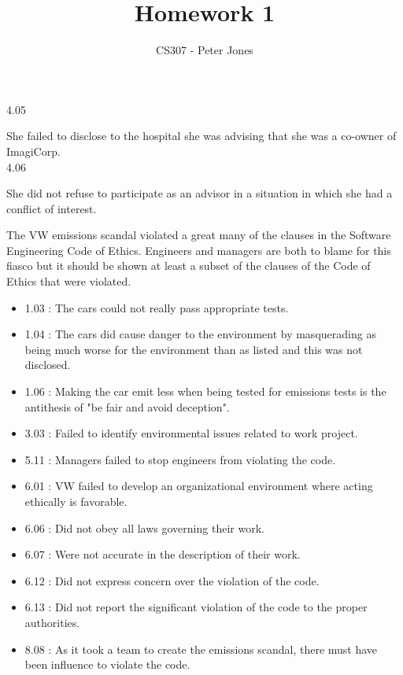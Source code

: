 \documentclass[12pt]{article}
\newenvironment{problem}[2][Problem]{\begin{trivlist}
\item[\hskip \labelsep {\bfseries #1}\hskip \labelsep {\bfseries #2.}]}{\end{trivlist}}
\begin{document}
 
 
\title{Homework 1}
\author{CS307 - Peter Jones}
\maketitle
 
\begin{problem}{1}
\end{problem}
 
4.05

She failed to disclose to the hospital she was advising that she was a co-owner of ImagiCorp.\\

4.06

She did not refuse to participate as an advisor in a situation in which she had a conflict of interest.

\pagebreak

\begin{problem}{2}
	
\end{problem}

The VW emissions scandal violated a great many of the clauses in the Software Engineering Code of Ethics. Engineers and managers are both to blame for this fiasco but it should be shown at least a subset of the clauses of the Code of Ethics that were violated.

\begin{itemize}
	\item 1.03 : The cars could not really pass appropriate tests.
	\item 1.04 : The cars did cause danger to the environment by masquerading as being much worse for the environment than as listed and this was not disclosed.
	\item 1.06 : Making the car emit less when being tested for emissions tests is the antithesis of "be fair and avoid deception".
	\item 3.03 : Failed to identify environmental issues related to work project.
	\item 5.11 : Managers failed to stop engineers from violating the code.
	\item 6.01 : VW failed to develop an organizational environment where acting ethically is favorable.
	\item 6.06 : Did not obey all laws governing their work.
	\item 6.07 : Were not accurate in the description of their work.
	\item 6.12 : Did not express concern over the violation of the code.
	\item 6.13 : Did not report the significant violation of the code to the proper authorities.
	\item 8.08 : As it took a team to create the emissions scandal, there must have been influence to violate the code.
\end{itemize}
\end{document}
